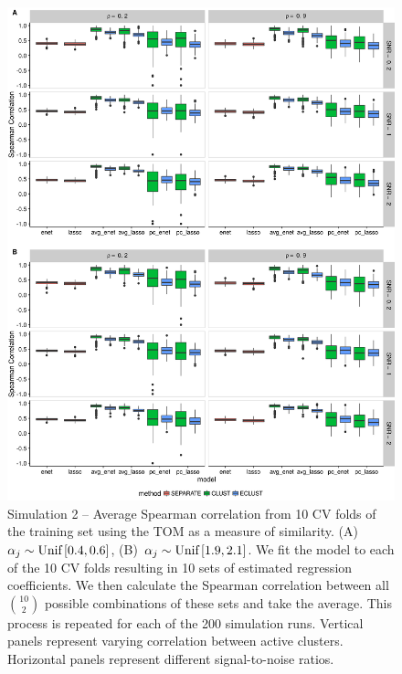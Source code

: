 \begin{figure}[H]
	\centering
	\includegraphics[scale=0.52, keepaspectratio]{./figs/hydra/results/figures/sim2-sept8/spearman_TOM_sim2.png}
	\caption{Simulation 2 -- Average Spearman correlation from 10 CV folds of the training set using the TOM as a measure of similarity. \mbox{(A) $\alpha_{j} \sim \textrm{{Unif}}\left[0.4, 0.6\right]$}, \mbox{(B) $\alpha_{j} \sim \textrm{{Unif}}\left[1.9, 2.1\right]$}. We fit the model to each of the 10 CV folds resulting in 10 sets of estimated regression coefficients. We then calculate the Spearman correlation between all $\binom{10}{2}$ possible combinations of these sets and take the average. This process is repeated for each of the 200 simulation runs. Vertical panels represent varying correlation between active clusters. Horizontal panels represent different signal-to-noise ratios.}
	\label{fig:spearman_TOM_sim2}
\end{figure}

